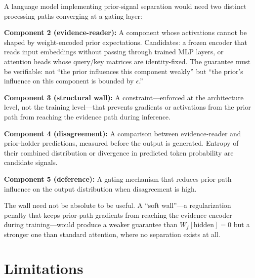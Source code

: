 \documentclass[11pt,letterpaper]{article}
\begin{document}
A language model implementing prior-signal separation would need two distinct processing paths converging at a gating layer:

\textbf{Component 2 (evidence-reader):} A component whose activations cannot be shaped by weight-encoded prior expectations. Candidates: a frozen encoder that reads input embeddings without passing through trained MLP layers, or attention heads whose query/key matrices are identity-fixed. The guarantee must be verifiable: not ``the prior influences this component weakly'' but ``the prior's influence on this component is bounded by $\epsilon$.''

\textbf{Component 3 (structural wall):} A constraint---enforced at the architecture level, not the training level---that prevents gradients or activations from the prior path from reaching the evidence path during inference.

\textbf{Component 4 (disagreement):} A comparison between evidence-reader and prior-holder predictions, measured before the output is generated. Entropy of their combined distribution or divergence in predicted token probability are candidate signals.

\textbf{Component 5 (deference):} A gating mechanism that reduces prior-path influence on the output distribution when disagreement is high.

The wall need not be absolute to be useful. A ``soft wall''---a regularization penalty that keeps prior-path gradients from reaching the evidence encoder during training---would produce a weaker guarantee than $W_f[\text{hidden}] = 0$ but a stronger one than standard attention, where no separation exists at all.

\section{Limitations}
\end{document}
